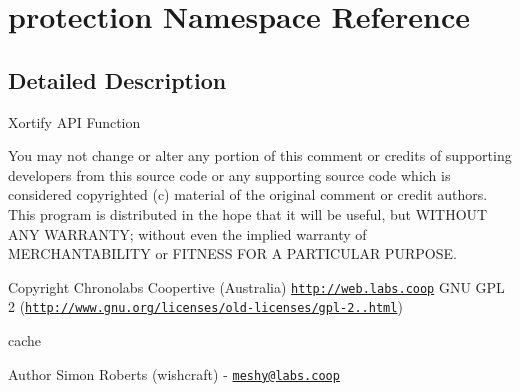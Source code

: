 \hypertarget{namespaceprotection}{\section{protection Namespace Reference}
\label{namespaceprotection}
}


\subsection{Detailed Description}
Xortify A\-P\-I Function

You may not change or alter any portion of this comment or credits of supporting developers from this source code or any supporting source code which is considered copyrighted (c) material of the original comment or credit authors. This program is distributed in the hope that it will be useful, but W\-I\-T\-H\-O\-U\-T A\-N\-Y W\-A\-R\-R\-A\-N\-T\-Y; without even the implied warranty of M\-E\-R\-C\-H\-A\-N\-T\-A\-B\-I\-L\-I\-T\-Y or F\-I\-T\-N\-E\-S\-S F\-O\-R A P\-A\-R\-T\-I\-C\-U\-L\-A\-R P\-U\-R\-P\-O\-S\-E.

\begin{DoxyCopyright}{Copyright}
Chronolabs Coopertive (Australia) \href{http://web.labs.coop}{\tt http\-://web.\-labs.\-coop}  G\-N\-U G\-P\-L 2 (\href{http://www.gnu.org/licenses/old-licenses/gpl-2.0.html}{\tt http\-://www.\-gnu.\-org/licenses/old-\/licenses/gpl-\/2..\-html})
\end{DoxyCopyright}
cache \begin{DoxyAuthor}{Author}
Simon Roberts (wishcraft) -\/ \href{mailto:meshy@labs.coop}{\tt meshy@labs.\-coop} 
\end{DoxyAuthor}
